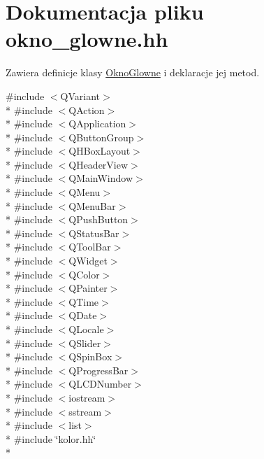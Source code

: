 \hypertarget{okno__glowne_8hh}{\section{Dokumentacja pliku okno\-\_\-glowne.\-hh}
\label{okno__glowne_8hh}
}


Zawiera definicje klasy \hyperlink{class_okno_glowne}{Okno\-Glowne} i deklaracje jej metod.  


{\ttfamily \#include $<$Q\-Variant$>$}\\*
{\ttfamily \#include $<$Q\-Action$>$}\\*
{\ttfamily \#include $<$Q\-Application$>$}\\*
{\ttfamily \#include $<$Q\-Button\-Group$>$}\\*
{\ttfamily \#include $<$Q\-H\-Box\-Layout$>$}\\*
{\ttfamily \#include $<$Q\-Header\-View$>$}\\*
{\ttfamily \#include $<$Q\-Main\-Window$>$}\\*
{\ttfamily \#include $<$Q\-Menu$>$}\\*
{\ttfamily \#include $<$Q\-Menu\-Bar$>$}\\*
{\ttfamily \#include $<$Q\-Push\-Button$>$}\\*
{\ttfamily \#include $<$Q\-Status\-Bar$>$}\\*
{\ttfamily \#include $<$Q\-Tool\-Bar$>$}\\*
{\ttfamily \#include $<$Q\-Widget$>$}\\*
{\ttfamily \#include $<$Q\-Color$>$}\\*
{\ttfamily \#include $<$Q\-Painter$>$}\\*
{\ttfamily \#include $<$Q\-Time$>$}\\*
{\ttfamily \#include $<$Q\-Date$>$}\\*
{\ttfamily \#include $<$Q\-Locale$>$}\\*
{\ttfamily \#include $<$Q\-Slider$>$}\\*
{\ttfamily \#include $<$Q\-Spin\-Box$>$}\\*
{\ttfamily \#include $<$Q\-Progress\-Bar$>$}\\*
{\ttfamily \#include $<$Q\-L\-C\-D\-Number$>$}\\*
{\ttfamily \#include $<$iostream$>$}\\*
{\ttfamily \#include $<$sstream$>$}\\*
{\ttfamily \#include $<$list$>$}\\*
{\ttfamily \#include \char`\"{}kolor.\-hh\char`\"{}}\\*
